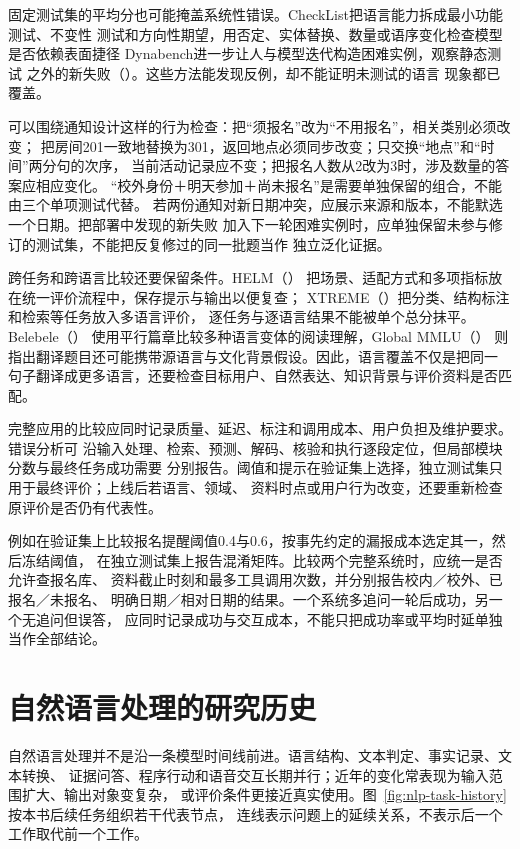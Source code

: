 固定测试集的平均分也可能掩盖系统性错误。CheckList把语言能力拆成最小功能测试、不变性
测试和方向性期望，用否定、实体替换、数量或语序变化检查模型是否依赖表面捷径
Dynabench进一步让人与模型迭代构造困难实例，观察静态测试
之外的新失败（\citeyear{kiela2021dynabench}）。这些方法能发现反例，却不能证明未测试的语言
现象都已覆盖。

可以围绕通知设计这样的行为检查：把“须报名”改为“不用报名”，相关类别必须改变；
把房间201一致地替换为301，返回地点必须同步改变；只交换“地点”和“时间”两分句的次序，
当前活动记录应不变；把报名人数从2改为3时，涉及数量的答案应相应变化。
“校外身份＋明天参加＋尚未报名”是需要单独保留的组合，不能由三个单项测试代替。
若两份通知对新日期冲突，应展示来源和版本，不能默选一个日期。把部署中发现的新失败
加入下一轮困难实例时，应单独保留未参与修订的测试集，不能把反复修过的同一批题当作
独立泛化证据。

跨任务和跨语言比较还要保留条件。HELM（\citeyear{nlp-intro-liang2023helm}）
把场景、适配方式和多项指标放在统一评价流程中，保存提示与输出以便复查；
XTREME（\citeyear{hu2020xtreme}）把分类、结构标注和检索等任务放入多语言评价，
逐任务与逐语言结果不能被单个总分抹平。Belebele（\citeyear{bandarkar2024belebele}）
使用平行篇章比较多种语言变体的阅读理解，Global MMLU（\citeyear{singh2025globalmmlu}）
则指出翻译题目还可能携带源语言与文化背景假设。因此，语言覆盖不仅是把同一
句子翻译成更多语言，还要检查目标用户、自然表达、知识背景与评价资料是否匹配。

完整应用的比较应同时记录质量、延迟、标注和调用成本、用户负担及维护要求。错误分析可
沿输入处理、检索、预测、解码、核验和执行逐段定位，但局部模块分数与最终任务成功需要
分别报告。阈值和提示在验证集上选择，独立测试集只用于最终评价；上线后若语言、领域、
资料时点或用户行为改变，还要重新检查原评价是否仍有代表性。

例如在验证集上比较报名提醒阈值0.4与0.6，按事先约定的漏报成本选定其一，然后冻结阈值，
在独立测试集上报告混淆矩阵。比较两个完整系统时，应统一是否允许查报名库、
资料截止时刻和最多工具调用次数，并分别报告校内／校外、已报名／未报名、
明确日期／相对日期的结果。一个系统多追问一轮后成功，另一个无追问但误答，
应同时记录成功与交互成本，不能只把成功率或平均时延单独当作全部结论。

\section{自然语言处理的研究历史}
\label{sec:nlp-research-history}

自然语言处理并不是沿一条模型时间线前进。语言结构、文本判定、事实记录、文本转换、
证据问答、程序行动和语音交互长期并行；近年的变化常表现为输入范围扩大、输出对象变复杂，
或评价条件更接近真实使用。图~\ref{fig:nlp-task-history}按本书后续任务组织若干代表节点，
连线表示问题上的延续关系，不表示后一个工作取代前一个工作。

